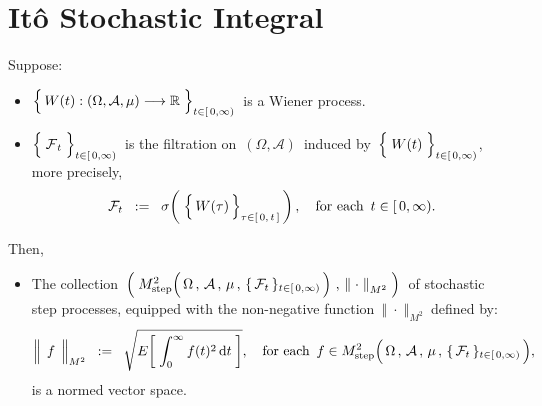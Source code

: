 

\section{It\^{o} Stochastic Integral}
\setcounter{theorem}{0}
\setcounter{equation}{0}


\renewcommand{\theenumi}{\roman{enumi}}
\renewcommand{\labelenumi}{\textnormal{(\theenumi)}$\;\;$}


\vskip 0.3cm
\begin{remark}
\mbox{}
\vskip 0.2cm
\noindent
Suppose:
\begin{itemize}
\item
	$\left\{\,\overset{{\color{white}.}}{W}(t) : (\Omega,\mathcal{A},\mu) \longrightarrow \Re \;\right\}_{t \in[\,0,\infty)}$\,
	is a Wiener process.
\item
	$\left\{\;\overset{{\color{white}.}}{\mathcal{F}}_{t}\;\right\}_{t\in[\,0,\infty)}$\,
	is the filtration on \,$(\Omega,\mathcal{A})$\, induced by
	\,$\left\{\;\overset{{\color{white}.}}{W}(t)\;\right\}_{t\in[\,0,\infty)}$,\,
	more precisely,
	\begin{equation*}
	\mathcal{F}_{t}
	\;\; := \;\;
		\sigma\!\left(\;\left\{\,\overset{{\color{white}.}}{W}(\tau)\,\right\}_{\tau\in[\,0,\,t\,]}\,\right),
	\quad
	\textnormal{for each \,$t \in [\,0,\infty)$}.
	\end{equation*}
\end{itemize}
Then,
\begin{itemize}
\item
	The collection
	\,$\left(\;
		M^{2}_{\textnormal{step}}\!\left(\,
			\overset{{\color{white}.}}{\Omega} \,,\, \mathcal{A} \,,\, \mu \,,\, \{\,\mathcal{F}_{t}\,\}_{t \in [\,0,\infty)}
			\,\right)
		\,,\,
		\left\Vert\;\cdot\;\right\Vert_{M^{2}}
		\;\right)$\,
	of stochastic step processes, equipped with the non-negative function
	\,$\left\Vert\;\cdot\;\right\Vert_{M^{2}}$\,
	defined by:
	\begin{equation*}
	\left\Vert\;\, \overset{{\color{white}}}{f} \,\;\right\Vert_{M^{2}}
	\;\; := \;\;
		\sqrt{E\!\left[\;
			\int_{0}^{\infty} f(t)^{2} \,\d t
			\;\right]},
		\quad
		\textnormal{for each \,$f \in M^{2}_{\textnormal{step}}\!
		\left(\,
			\overset{{\color{white}.}}{\Omega} \,,\, \mathcal{A} \,,\, \mu \,,\, \{\,\mathcal{F}_{t}\,\}_{t \in [\,0,\infty)}
			\,\right)$},
	\end{equation*}
	is a normed vector space.


\end{itemize}
\end{remark}
